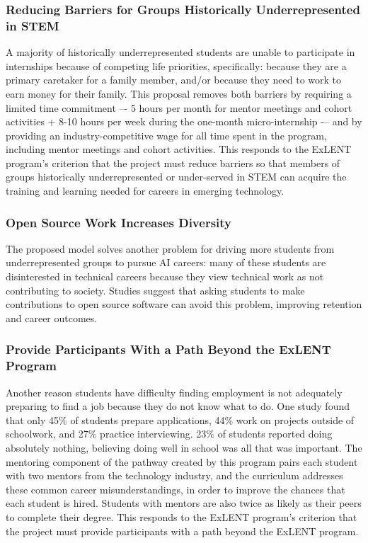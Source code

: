 \subsubsection{Reducing Barriers for Groups Historically Underrepresented in STEM}

A majority of historically underrepresented students are unable to participate in internships because of competing life priorities, specifically: because they are a primary caretaker for a family member, and/or because they need to work to earn money for their family. \cite{kapoorBarriersSecuringIndustry2020} This proposal removes both barriers by requiring a limited time commitment –- 5 hours per month for mentor meetings and cohort activities + 8-10 hours per week during the one-month micro-internship -– and by providing an industry-competitive wage for all time spent in the program, including mentor meetings and cohort activities. This responds to the ExLENT program’s criterion that the project must reduce barriers so that members of groups historically underrepresented or under-served in STEM can acquire the training and learning needed for careers in emerging technology.

\subsubsection{Open Source Work Increases Diversity}

The proposed model solves another problem for driving more students from underrepresented groups to pursue AI careers: many of these students are disinterested in technical careers because they view technical work as not contributing to society. Studies suggest that asking students to make contributions to open source software can avoid this problem, improving retention and career outcomes.\cite{ellisPowerOpenSource2021,morelliRevitalizingComputingEducation2009,ellisCanHumanitarianOpensource2007}

\subsubsection{Provide Participants With a Path Beyond the ExLENT Program}

Another reason students have difficulty finding employment is not adequately preparing to find a job because they do not know what to do. One study found that only 45\% of students prepare applications, 44\% work on projects outside of schoolwork, and 27\% practice interviewing. 23\% of students reported doing absolutely nothing, believing doing well in school was all that was important. \cite{kapoorExploringParticipationCS2020} The mentoring component of the pathway created by this program pairs each student with two mentors from the technology industry, and the curriculum addresses these common career misunderstandings, in order to improve the chances that each student is hired. Students with mentors are also twice as likely as their peers to complete their degree.\cite{salinitriEffectsFormalMentoring2005,campbellFacultyStudentMentor1997b,mangoldWhoGoesWho2002} This responds to the ExLENT program’s criterion that the project must provide participants with a path beyond the ExLENT program.
